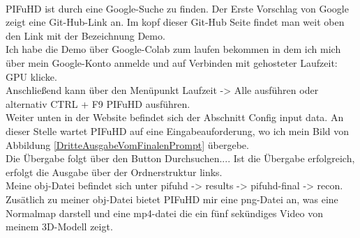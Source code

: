 \\
PIFuHD ist durch eine Google-Suche zu finden. Der Erste Vorschlag von Google zeigt eine Git-Hub-Link an. Im kopf dieser Git-Hub Seite findet man weit oben den Link mit der Bezeichnung Demo.
\\
Ich habe die Demo über Google-Colab zum laufen bekommen in dem ich mich über mein Google-Konto anmelde und auf Verbinden mit gehosteter Laufzeit: GPU klicke.
\\
Anschließend kann über den Menüpunkt Laufzeit -> Alle ausführen oder alternativ CTRL + F9 PIFuHD ausführen.
\\
Weiter unten in der Website befindet sich der Abschnitt Config input data. An dieser Stelle wartet PIFuHD auf eine Eingabeauforderung, wo ich mein Bild von Abbildung \ref{DritteAusgabeVomFinalenPrompt} übergebe.
\\
Die Übergabe folgt über den Button Durchsuchen.... Ist die Übergabe erfolgreich, erfolgt die Ausgabe über der Ordnerstruktur links.
\\
Meine obj-Datei befindet sich unter pifuhd -> results -> pifuhd-final -> recon. Zusätlich zu meiner obj-Datei bietet PIFuHD mir eine png-Datei an, was eine Normalmap darstell und eine mp4-datei die ein fünf sekündiges Video von meinem 3D-Modell zeigt.
\\

